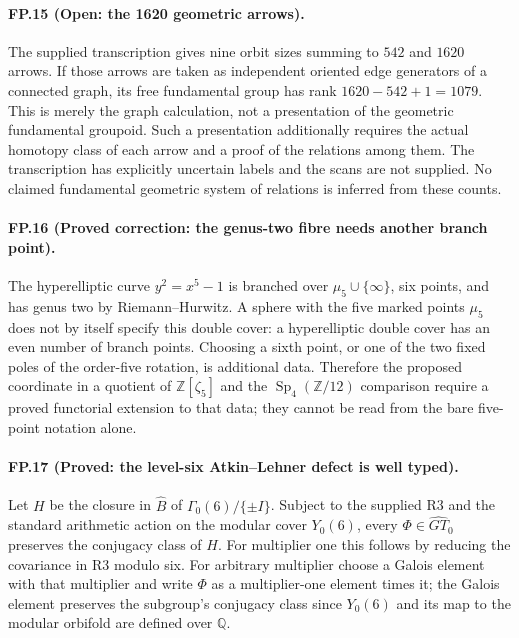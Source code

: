 \paragraph{FP.15 (Open: the 1620 geometric arrows).}
The supplied transcription gives nine orbit sizes summing to $542$ and
$1620$ arrows. If those arrows are taken as independent oriented edge
generators of a connected graph, its free fundamental group has rank
$1620-542+1=1079$. This is merely the graph calculation, not a presentation
of the geometric fundamental groupoid. Such a presentation additionally
requires the actual homotopy class of each arrow and a proof of the
relations among them. The transcription has explicitly uncertain labels
and the scans are not supplied. No claimed fundamental geometric system
of relations is inferred from these counts.

\paragraph{FP.16 (Proved correction: the genus-two fibre needs another branch point).}
The hyperelliptic curve $y^2=x^5-1$ is branched over
$\mu_5\cup\{\infty\}$, six points, and has genus two by
Riemann--Hurwitz. A sphere with the five marked points $\mu_5$ does not by
itself specify this double cover: a hyperelliptic double cover has an even
number of branch points. Choosing a sixth point, or one of the two fixed
poles of the order-five rotation, is additional data. Therefore the
proposed coordinate in a quotient of $\mathbb Z[\zeta_5]$ and the
$\operatorname{Sp}_4(\mathbb Z/12)$ comparison require a proved
functorial extension to that data; they cannot be read from the bare
five-point notation alone.

\paragraph{FP.17 (Proved: the level-six Atkin--Lehner defect is well typed).}
Let $H$ be the closure in $\widehat B$ of
$\Gamma_0(6)/\{\pm I\}$. Subject to the supplied R3 and the standard
arithmetic action on the modular cover $Y_0(6)$, every
$\Phi\in\widehat{GT}_0$ preserves the conjugacy class of $H$.
For multiplier one this follows by reducing the covariance in R3 modulo
six. For arbitrary multiplier choose a Galois element with that multiplier
and write $\Phi$ as a multiplier-one element times it; the Galois element
preserves the subgroup's conjugacy class since $Y_0(6)$ and its map to the
modular orbifold are defined over $\mathbb Q$.

